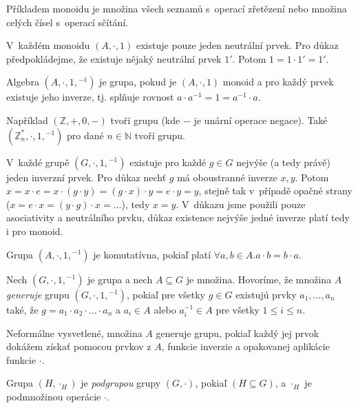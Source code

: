 Příkladem monoidu je množina všech seznamů s~operací zřetězení nebo
množina celých čísel s~operací sčítání.

V~každém monoidu $(A, \cdot, 1)$ existuje pouze jeden neutrální
prvek. Pro důkaz předpokládejme, že existuje nějaký neutrální prvek $1'$.
Potom $1 = 1 \cdot 1' = 1'$.

\begin{definition}[Grupa]
    Algebra $(A, \cdot, 1, {^{-1}})$ je grupa, pokud
    je $(A, \cdot, 1)$ monoid a pro každý prvek existuje jeho 
	inverze, tj. splňuje rovnost $a \cdot a^{-1} = 1 = a^{-1} \cdot a$.
\end{definition}

Například $(\mathbb{Z}, +, 0, -)$ tvoří grupu (kde $-$ je unární operace negace).
Také $(\mathbb{Z}^*_n, \cdot, 1, {^{-1}})$ pro dané $n \in \mathbb{N}$ tvoří grupu.

V~každé grupě $(G, \cdot, 1, {^{-1}})$ existuje pro každé $g \in G$ nejvýše
(a tedy právě) jeden inverzní prvek.
Pro důkaz nechť $g$ má oboustranné inverze $x,y$.
Potom $x = x \cdot e = x \cdot (g \cdot y) = (g \cdot x) \cdot y
= e \cdot y = y$, stejně tak v~případě opačné strany
($x = e \cdot x = (y \cdot g) \cdot x =\ldots$),
tedy $x = y$. V~důkazu jsme použili pouze asociativity a neutrálního
prvku, důkaz existence nejvýše jedné inverze platí tedy i pro monoid.

\begin{definition}
    Grupa $(A, \cdot, 1, {^{-1}})$ je komutatívna, pokiaľ platí
	$\forall a,b \in A.a\cdot b = b \cdot a$.
\end{definition}

\begin{definition}
    Nech $(G, \cdot, 1, {^{-1}})$ je grupa a nech $A \subseteq G$ je množina.
	Hovoríme, že množina $A$ {\em generuje} grupu $(G, \cdot, 1, {^{-1}})$,
	pokiaľ pre všetky $g \in G$ existujú prvky $a_1, \ldots, a_n$ také, 
	že $g=a_1 \cdot a_2 \cdot \ldots \cdot a_n$ a
	$a_i \in A$ alebo $a_i^{-1} \in A$ pre všetky $1 \leq i \leq n$. 
\end{definition}

Neformálne vysvetlené, množina $A$ generuje grupu, pokiaľ každý
jej prvok dokážem získať pomocou prvkov z $A$, funkcie inverzie a opakovanej
aplikácie funkcie $\cdot$.

\begin{definition}[Podgrupa]
    Grupa $(H,\cdot_H)$ je {\em podgrupou} grupy $(G, \cdot)$, pokiaľ 
	$(H \subseteq G)$, a $\cdot_H$ je podmnožinou operácie $\cdot$.
\end{definition}

